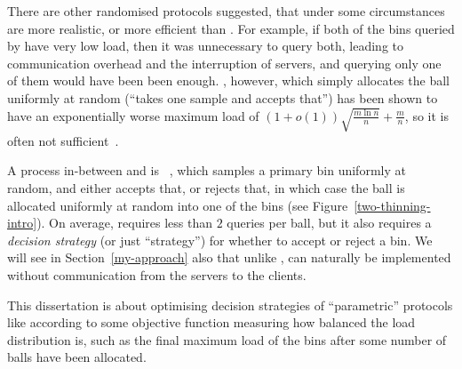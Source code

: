 There are other randomised protocols suggested, that under some circumstances are more realistic, or more efficient than \TwoChoice. For example, if both of the bins queried by \TwoChoice have very low load, then it was unnecessary to query both, leading to communication overhead and the interruption of servers, and querying only one of them would have been been enough. \OneChoice, however, which simply allocates the ball uniformly at random (``takes one sample and accepts that'') has been shown to have an exponentially worse maximum load of $(1+o(1))\sqrt{\frac{m\ln n}{n}}+\frac{m}{n}$, so it is often not sufficient~\cite{mitzenmacher2005probabilitybook}.


A process in-between \OneChoice and \TwoChoice is \TwoThinning~\cite{feldheim2021thinning}, which samples a primary bin uniformly at random, and either accepts that, or rejects that, in which case the ball is allocated uniformly at random into one of the bins (see Figure~\ref{two-thinning-intro}). On average, \TwoThinning requires less than $2$ queries per ball, but it also requires a \textit{decision strategy} (or just ``strategy'') for whether to accept or reject a bin. We will see in Section~\ref{my-approach} also that unlike \TwoChoice, \TwoThinning can naturally be implemented without communication from the servers to the clients.

This dissertation is about optimising decision strategies of ``parametric'' protocols like \TwoThinning according to some objective function measuring how balanced the load distribution is, such as the final maximum load of the bins after some number of balls have been allocated.



